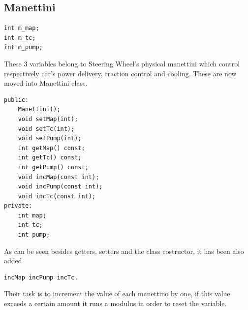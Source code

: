 \documentclass[12pt, letterpaper]{article}
\begin{document}
\subsection{Manettini}
\begin{verbatim}
int m_map;
int m_tc;
int m_pump;
\end{verbatim}
These 3 variables belong to Steering Wheel's physical manettini which control respectively car's power delivery, traction control and cooling. These are now moved into Manettini class.
\begin{verbatim}
public:
    Manettini();
    void setMap(int);
    void setTc(int);
    void setPump(int);
    int getMap() const;
    int getTc() const;
    int getPump() const;
    void incMap(const int);
    void incPump(const int);
    void incTc(const int);
private:
    int map;
    int tc;
    int pump;
\end{verbatim}
As can be seen besides getters, setters and the class costructor, it has been also added 
\begin{verbatim}incMap incPump incTc.\end{verbatim}
Their task is to increment the value of each manettino by one, if this value exceeds a certain amount it runs a modulus in order to reset the variable.
\end{document}
